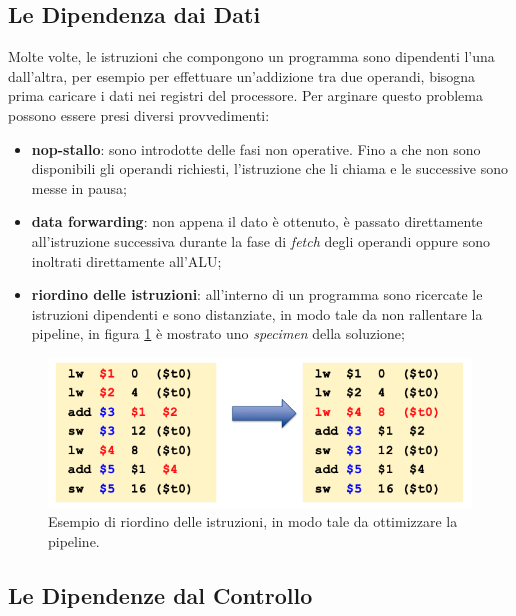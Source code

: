 \documentclass{article}
\begin{document}
\subsection{Le Dipendenza dai Dati}

Molte volte, le istruzioni che compongono un programma sono dipendenti l'una dall'altra, per esempio per effettuare un'addizione tra due operandi, bisogna prima caricare i dati nei registri del processore. Per arginare questo problema possono essere presi diversi provvedimenti:
\begin{itemize}
	\item \textbf{nop-stallo}: sono introdotte delle fasi non operative. Fino a che non sono disponibili gli operandi richiesti, l'istruzione che li chiama e le successive sono messe in pausa;

	\item \textbf{data forwarding}: non appena il dato è ottenuto, è passato direttamente all'istruzione successiva durante la fase di \textit{fetch} degli operandi oppure sono inoltrati direttamente all'ALU;

	\item \textbf{riordino delle istruzioni}: all'interno di un programma sono ricercate le istruzioni dipendenti e sono distanziate, in modo tale da non rallentare la pipeline, in figura \ref{riordinoistruzioni} è mostrato uno \textit{specimen} della soluzione;
\end{itemize}

\begin{figure}[h]
	\centering
	\includegraphics[scale=0.3]{immagini/riordinoistruzioni}
	\caption{Esempio di riordino delle istruzioni, in modo tale da ottimizzare la pipeline.}
	\label{riordinoistruzioni}
\end{figure}

\subsection{Le Dipendenze dal Controllo}
\end{document}
